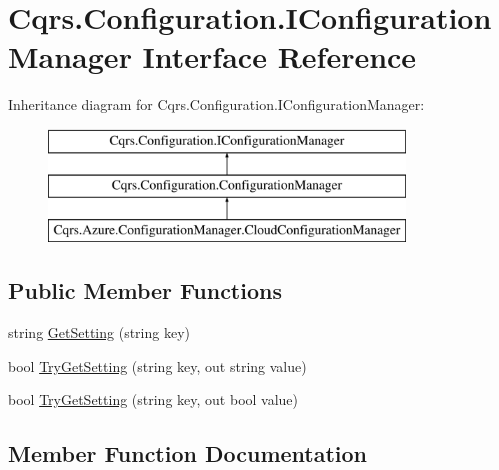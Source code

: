 \hypertarget{interfaceCqrs_1_1Configuration_1_1IConfigurationManager}{}\section{Cqrs.\+Configuration.\+I\+Configuration\+Manager Interface Reference}
\label{interfaceCqrs_1_1Configuration_1_1IConfigurationManager}
Inheritance diagram for Cqrs.\+Configuration.\+I\+Configuration\+Manager\+:\begin{figure}[H]
\begin{center}
\leavevmode
\includegraphics[height=3.000000cm]{interfaceCqrs_1_1Configuration_1_1IConfigurationManager}
\end{center}
\end{figure}
\subsection*{Public Member Functions}
\begin{DoxyCompactItemize}
\item 
string \hyperlink{interfaceCqrs_1_1Configuration_1_1IConfigurationManager_a9f7b7d4d8c26a0589f01c8a7f69901ef}{Get\+Setting} (string key)
\item 
bool \hyperlink{interfaceCqrs_1_1Configuration_1_1IConfigurationManager_ac4478405e3d9e1c97d14953aea4e695b}{Try\+Get\+Setting} (string key, out string value)
\item 
bool \hyperlink{interfaceCqrs_1_1Configuration_1_1IConfigurationManager_a8389181330999fcb8e30af4dbb56d35e}{Try\+Get\+Setting} (string key, out bool value)
\end{DoxyCompactItemize}


\subsection{Member Function Documentation}
\mbox{\label{interfaceCqrs_1_1Configuration_1_1IConfigurationManager_a9f7b7d4d8c26a0589f01c8a7f69901ef}} 
